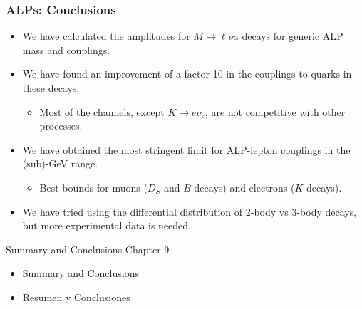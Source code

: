 \documentclass[mathserif, 10pt, dvipsnames]{beamer}
\begin{document}
\begin{frame}\frametitle{ALPs: Conclusions}
    \begin{itemize}
        \item We have calculated the amplitudes for $M\to \ell \nu a$ decays for generic ALP mass and couplings.
        \item We have found an improvement of a factor 10 in the couplings to quarks in these decays.
              \begin{itemize}
                  \item Most of the channels, except $K\to e\nu_e$, are not competitive with other processes.
              \end{itemize}
        \item We have obtained the most stringent limit for ALP-lepton couplings in the (sub)-GeV range.
              \begin{itemize}
                  \item Best bounds for muons ($D_S$ and $B$ decays) and electrons ($K$ decays).
              \end{itemize}
        \item We have tried using the differential distribution of 2-body vs 3-body decays, but more experimental data is needed.
    \end{itemize}
\end{frame}

\begin{frame}[plain]
    \vspace{1.3cm}
\begin{block}{\huge Summary and Conclusions}
        Chapter 9
    \end{block}
    \vspace{1.3cm}
    \begin{itemize}
\item Summary and Conclusions
\item Resumen y Conclusiones
    \end{itemize}

\end{frame}
\end{document}
